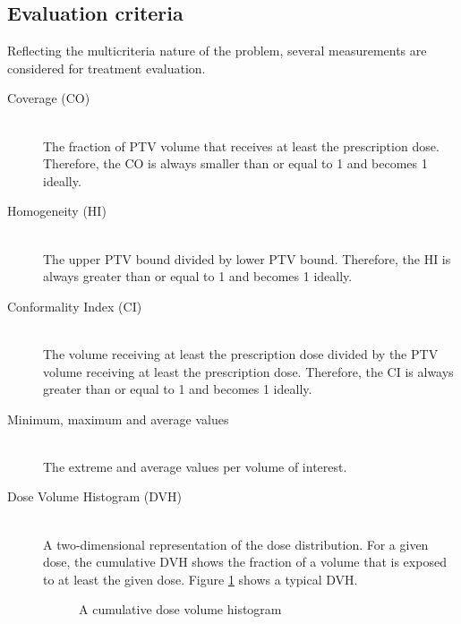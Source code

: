 \documentclass[12pt]{article}
\begin{document}
\subsection{Evaluation criteria}
	Reflecting the multicriteria nature of the problem, several measurements are considered for treatment evaluation.
	\begin{description}
		\item[Coverage (CO)]~\\
			The fraction of PTV volume that receives at least the prescription dose. Therefore, the CO is always smaller than or equal to 1 and becomes 1 ideally.
		\item[Homogeneity (HI)]~\\
			The upper PTV bound divided by lower PTV bound. Therefore, the HI is always greater than or equal to 1 and becomes 1 ideally.
		\item[Conformality Index (CI)]~\\
			The volume receiving at least the prescription dose divided by the PTV volume receiving at least the prescription dose. Therefore, the CI is always greater than or equal to 1 and becomes 1 ideally.
		\item[Minimum, maximum and average values]~\\
			The extreme and average values per volume of interest.
		\item[Dose Volume Histogram (DVH)]~\\
			A two-dimensional representation of the dose distribution. For a given dose, the cumulative DVH shows the fraction of a volume that is exposed to at least the given dose. Figure \ref{fig:evalCritDVH} shows a typical DVH.
			\begin{figure}[ht]
				\centering
				 
				\caption{A cumulative dose volume histogram}
				\label{fig:evalCritDVH}
			\end{figure}
			


\end{description}
\end{document}
